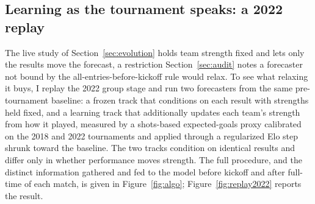 \documentclass[11pt,letterpaper]{article}
\begin{document}
\subsection{Learning as the tournament speaks: a 2022 replay}\label{sec:replay}

The live study of Section~\ref{sec:evolution} holds team strength fixed and lets only the results move the forecast, a restriction Section~\ref{sec:audit} notes a forecaster not bound by the all-entries-before-kickoff rule would relax. To see what relaxing it buys, I replay the 2022 group stage and run two forecasters from the same pre-tournament baseline: a frozen track that conditions on each result with strengths held fixed, and a learning track that additionally updates each team's strength from how it played, measured by a shots-based expected-goals proxy calibrated on the 2018 and 2022 tournaments and applied through a regularized Elo step shrunk toward the baseline. The two tracks condition on identical results and differ only in whether performance moves strength. The full procedure, and the distinct information gathered and fed to the model before kickoff and after full-time of each match, is given in Figure~\ref{fig:algo}; Figure~\ref{fig:replay2022} reports the result.
\end{document}
